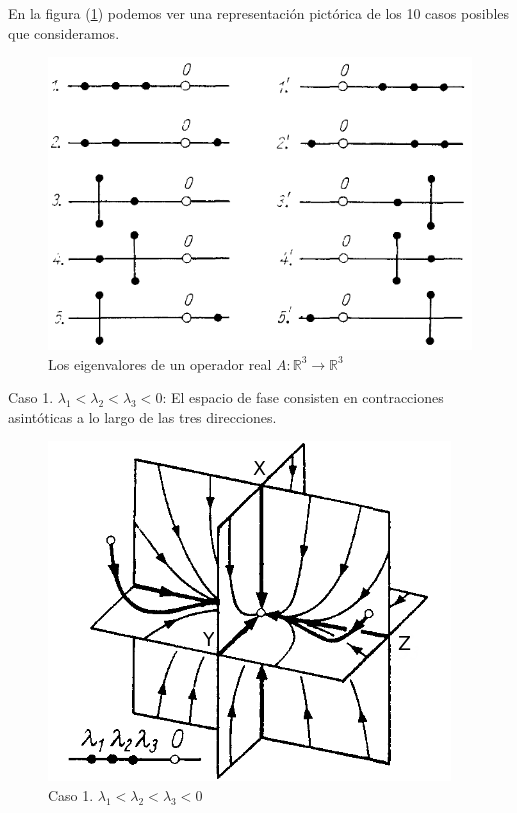 \documentclass[a4paper,10pt]{article}
\begin{document}
\vspace{.3cm}

En la figura (\ref{fig:problema3fig1}) podemos ver una representación pictórica de los
10 casos posibles que consideramos. 

\begin{figure}[h!]
 \centering
\includegraphics[scale=0.3]{problema3fig1}
\caption{Los eigenvalores de un operador real $A: \mathbb{R}^3 \rightarrow \mathbb{R}^3$}
\label{fig:problema3fig1}
\end{figure}


Caso 1. $\lambda_1 < \lambda_2 < \lambda_3 < 0$: El espacio de fase consisten en contracciones asintóticas
a lo largo de las tres direcciones.

\begin{figure}[h!]
 \centering
\includegraphics[scale=0.3]{problema3fig2}
\caption{Caso 1. $\lambda_1 < \lambda_2 < \lambda_3 < 0$}
\label{fig:problema3fig2}
\end{figure}
\vspace{.3cm}
\end{document}
